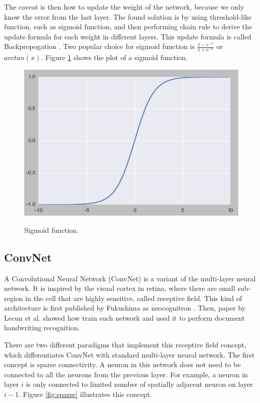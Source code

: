 \documentclass[a4paper,11pt]{kth-mag}
\begin{document}
The caveat is then how to update the weight of the network, because we only know the error from the last layer. The found solution is by using threshold-like function, such as sigmoid function, and then performing chain rule to derive the update formula for each weight in different layers. This update formula is called Backpropogation \cite{rumelhart1986backprop}. Two popular choice for sigmoid function is $\frac{1-e^{-x}}{1+e^{-x}}$ or $arctan(x)$. Figure \ref{fig:sigmoid} shows the plot of a sigmoid function.

\begin{figure}[h]
\centering
\includegraphics[scale=0.5]{image/sigmoid.png}
\label{fig:sigmoid}
\caption{Sigmoid function.}
\end{figure}

\subsection{ConvNet}
A Convolutional Neural Network (ConvNet) is a variant of the multi-layer neural network. It is inspired by the visual cortex in retina, where there are small sub-region in the cell that are highly sensitive, called receptive field. This kind of architecture is first published by Fukushima as neocognitron \cite{fukushima}. Then, paper by Lecun et al. \cite{lecunn} showed how train such network and used it to perform document handwriting recognition.

There are two different paradigms that implement this receptive field concept, which differentiates ConvNet with standard multi-layer neural network. The first concept is sparse connectivity. A neuron in this network does not need to be connected to all the neurons from the previous layer. For example, a neuron in layer $i$ is only connected to limited number of spatially adjacent neuron on layer $i-1$. Figure \ref{fig:sparse} illustrates this concept.
\end{document}

